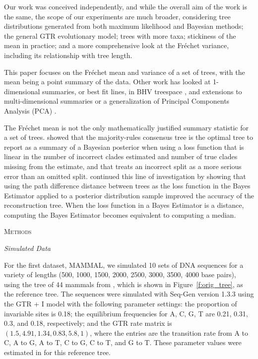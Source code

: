 \documentclass[12pt,letterpaper]{article}
\theoremstyle{plain}
\theoremstyle{definition}
\renewcommand{\section}[1]{%
\bigskip
\begin{center}
\begin{Large}
\normalfont\scshape #1
\medskip
\end{Large}
\end{center}}
\renewcommand{\subsection}[1]{%
\bigskip
\begin{center}
\begin{large}
\normalfont\itshape #1
\end{large}
\end{center}}
\begin{document}
Our work was conceived independently, and while the overall aim of the work is the same, the scope of our experiments are much broader, considering tree distributions generated from both maximum likelihood and Bayesian methods; the general GTR evolutionary model; trees with more taxa; stickiness of the mean in practice; and a more comprehensive look at the Fr\'echet variance, including its relationship with tree length.

This paper focuses on the Fr\'echet mean and variance of a set of trees, with the mean being a point summary of the data.  Other work has looked at 1-dimensional summaries, or best fit lines, in BHV treespace \citep{NyePCA1,NyePCA2,IPMI}, and extensions to multi-dimensional summaries or a generalization of Principal Components Analysis (PCA) \citep{NyeYoshidaEtal}.

The Fr\'echet mean is not the only mathematically justified summary statistic for a set of trees.  \citet{holder2008justification} showed that the majority-rules consensus tree is the optimal tree to report as a summary of a Bayesian posterior when using a loss function that is linear in the number of incorrect clades estimated and number of true clades missing from the estimate, and that treats an incorrect split as a more serious error than an omitted split.  \citet{huggins2011bayes} continued this line of investigation by showing that using the path difference distance \citep{steel1993distributions} between trees as the loss function in the Bayes Estimator applied to a posterior distribution sample improved the accuracy of the reconstruction tree.  When the loss function in a Bayes Estimator is a distance, computing the Bayes Estimator becomes equivalent to computing a median.



\bigskip
\section{Methods}
\label{sec2}

\subsection{Simulated Data} \label{s:simulation_method}

For the first dataset, MAMMAL, we simulated 10 sets of DNA sequences for a variety of lengths (500, 1000, 1500, 2000, 2500, 3000, 3500, 4000 base pairs), using the tree of 44 mammals from \citet{Murphy01}, which is shown in Figure~\ref{f:orig_tree}, as the reference tree.  The sequences were simulated with Seq-Gen version 1.3.3 \citep{seq-gen} using the GTR + I model with the following parameter settings:  the proportion of invariable sites is 0.18; the equilibrium frequencies for A, C, G, T are 0.21, 0.31, 0.3, and 0.18, respectively; and the GTR rate matrix is $(1.5,4.91,1.34,0.83,5.8,1)$, where the entries are the transition rate from A to C, A to G, A to T, C to G, C to T, and G to T.  These parameter values were estimated in \citet{Hillis} for this reference tree.
\end{document}
